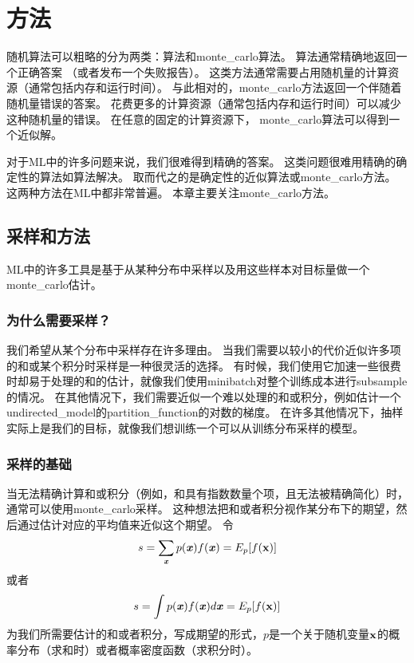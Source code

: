 \chapter{方法}
\label{chap:monte_carlo_methods}

随机算法可以粗略的分为两类：算法和\gls{monte_carlo}算法。
算法通常精确地返回一个正确答案 （或者发布一个失败报告）。
这类方法通常需要占用随机量的计算资源（通常包括内存和运行时间）。
与此相对的，\gls{monte_carlo}方法返回一个伴随着随机量错误的答案。
花费更多的计算资源（通常包括内存和运行时间）可以减少这种随机量的错误。
在任意的固定的计算资源下， \gls{monte_carlo}算法可以得到一个近似解。

对于\gls{ML}中的许多问题来说，我们很难得到精确的答案。
这类问题很难用精确的确定性的算法如算法解决。
取而代之的是确定性的近似算法或\gls{monte_carlo}方法。
这两种方法在\gls{ML}中都非常普遍。
本章主要关注\gls{monte_carlo}方法。

\section{采样和方法}
\label{sec:sampling_and_monte_carlo_methods}

\gls{ML}中的许多工具是基于从某种分布中采样以及用这些样本对目标量做一个\gls{monte_carlo}估计。

\subsection{为什么需要采样？}
\label{sec:why_sampling}

我们希望从某个分布中采样存在许多理由。
当我们需要以较小的代价近似许多项的和或某个积分时采样是一种很灵活的选择。
有时候，我们使用它加速一些很费时却易于处理的和的估计，就像我们使用\gls{minibatch}对整个训练成本进行subsample的情况。
在其他情况下，我们需要近似一个难以处理的和或积分，例如估计一个\gls{undirected_model}的\gls{partition_function}的对数的梯度。
在许多其他情况下，抽样实际上是我们的目标，就像我们想训练一个可以从训练分布采样的模型。

\subsection{采样的基础}
\label{sec:basics_of_monte_carlo_sampling}

当无法精确计算和或积分（例如，和具有指数数量个项，且无法被精确简化）时，通常可以使用\gls{monte_carlo}采样。
这种想法把和或者积分视作某分布下的期望，然后通过估计对应的平均值来近似这个期望。
令
\begin{align}
s = \sum_{\boldsymbol{\mathit{x}}} p(\boldsymbol{\mathit{x}})f(\boldsymbol{\mathit{x}}) = E_p[f(\mathbf{x})]
\end{align}
或者
\begin{align}
\label{eqn:integra}
s = \int p(\boldsymbol{\mathit{x}})f(\boldsymbol{\mathit{x}})d\boldsymbol{\mathit{x}} = E_p[f(\mathbf{x})]
\end{align}
为我们所需要估计的和或者积分，写成期望的形式，$p$是一个关于随机变量$\mathbf{x}$的概率分布（求和时）或者概率密度函数（求积分时）。

